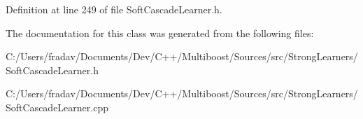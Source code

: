 Definition at line 249 of file Soft\-Cascade\-Learner.\-h.



The documentation for this class was generated from the following files\-:\begin{DoxyCompactItemize}
\item 
C\-:/\-Users/fradav/\-Documents/\-Dev/\-C++/\-Multiboost/\-Sources/src/\-Strong\-Learners/Soft\-Cascade\-Learner.\-h\item 
C\-:/\-Users/fradav/\-Documents/\-Dev/\-C++/\-Multiboost/\-Sources/src/\-Strong\-Learners/Soft\-Cascade\-Learner.\-cpp\end{DoxyCompactItemize}
